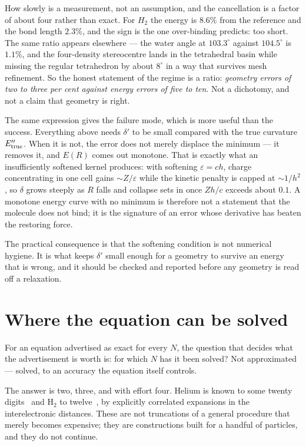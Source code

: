 \documentclass[11pt]{article}
\begin{document}
How slowly is a measurement, not an assumption, and the cancellation is a factor of about four
rather than exact. For $H_2$ the energy is $8.6\%$ from the reference and the bond length $2.3\%$,
and the sign is the one over-binding predicts: too short. The same ratio appears elsewhere --- the
water angle at $103.3^\circ$ against $104.5^\circ$ is $1.1\%$, and the four-density stereocentre
lands in the tetrahedral basin while missing the regular tetrahedron by about $8^\circ$ in a way that
survives mesh refinement. So the honest statement of the regime is a ratio: \emph{geometry errors of
two to three per cent against energy errors of five to ten}. Not a dichotomy, and not a claim that
geometry is right.

The same expression gives the failure mode, which is more useful than the success. Everything above
needs $\delta'$ to be small compared with the true curvature $E_{\rm true}''$. When it is not, the
error does not merely displace the minimum --- it removes it, and $E(R)$ comes out monotone. That is
exactly what an insufficiently softened kernel produces: with softening $\varepsilon = ch$, charge
concentrating in one cell gains $\sim Z/\varepsilon$ while the kinetic penalty is capped at
$\sim 1/h^2$, so $\delta$ grows steeply as $R$ falls and collapse sets in once $Zh/c$ exceeds about
$0.1$. A monotone energy curve with no minimum is therefore not a statement that the molecule does
not bind; it is the signature of an error whose derivative has beaten the restoring force.

The practical consequence is that the softening condition is not numerical hygiene. It is what keeps
$\delta'$ small enough for a geometry to survive an energy that is wrong, and it should be checked
and reported before any geometry is read off a relaxation.

\section{Where the equation can be solved}\label{sec:curve}

For an equation advertised as exact for every $N$, the question that decides what the advertisement
is worth is: for which $N$ has it been solved? Not approximated --- solved, to an accuracy the
equation itself controls.

The answer is two, three, and with effort four. Helium is known to some twenty
digits~\cite{Nakashima2007} and H$_2$ to twelve~\cite{KolosWolniewicz}, by explicitly correlated
expansions in the interelectronic distances. These are not truncations of a general procedure that
merely becomes expensive; they are constructions built for a handful of particles, and they do not
continue.
\end{document}
